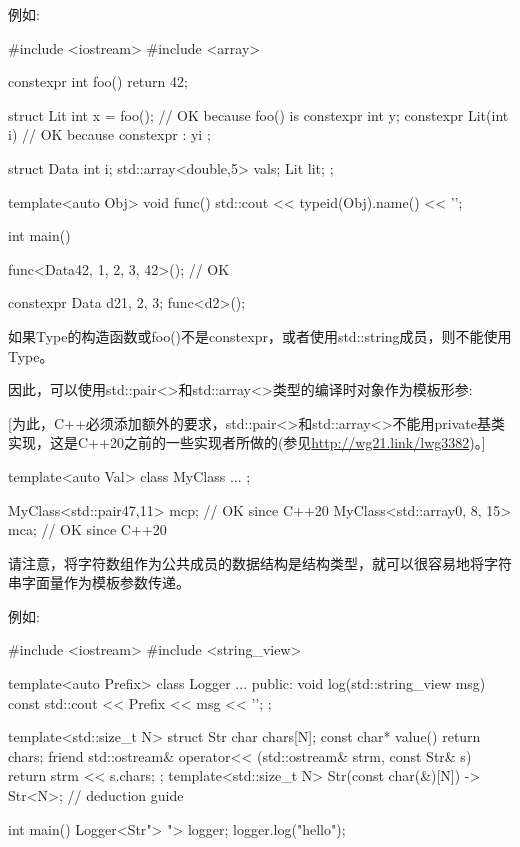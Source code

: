 例如:


\begin{cpp}
#include <iostream>
#include <array>

constexpr int foo()
{
	return 42;
}

struct Lit {
	int x = foo(); // OK because foo() is constexpr
	int y;
	constexpr Lit(int i) // OK because constexpr
		: y{i} {
	}
};

struct Data {
	int i;
	std::array<double,5> vals;
	Lit lit;
};

template<auto Obj>
void func()
{
	std::cout << typeid(Obj).name() << '\n';
}

int main()
{
	func<Data{42, {1, 2, 3}, 42}>(); // OK
	
	constexpr Data d2{1, {2}, 3};
	func<d2>();
}
\end{cpp}

如果Type的构造函数或foo()不是constexpr，或者使用std::string成员，则不能使用Type。


因此，可以使用std::pair<>和std::array<>类型的编译时对象作为模板形参:

[为此，C++必须添加额外的要求，std::pair<>和std::array<>不能用private基类实现，这是C++20之前的一些实现者所做的(参见\url{http://wg21.link/lwg3382})。]

\begin{cpp}
template<auto Val>
class MyClass {
	...
};

MyClass<std::pair{47,11}> mcp; // OK since C++20
MyClass<std::array{0, 8, 15}> mca; // OK since C++20
\end{cpp}


请注意，将字符数组作为公共成员的数据结构是结构类型，就可以很容易地将字符串字面量作为模板参数传递。

例如:


\begin{cpp}
#include <iostream>
#include <string_view>

template<auto Prefix>
class Logger {
	...
public:
	void log(std::string_view msg) const {
		std::cout << Prefix << msg << '\n';
	}
};

template<std::size_t N>
struct Str {
	char chars[N];
	const char* value() {
		return chars;
	}
	friend std::ostream& operator<< (std::ostream& strm, const Str& s) {
		return strm << s.chars;
	}
};
template<std::size_t N> Str(const char(&)[N]) -> Str<N>; // deduction guide

int main()
{
	Logger<Str{"> "}> logger;
	logger.log("hello");
}
\end{cpp}

